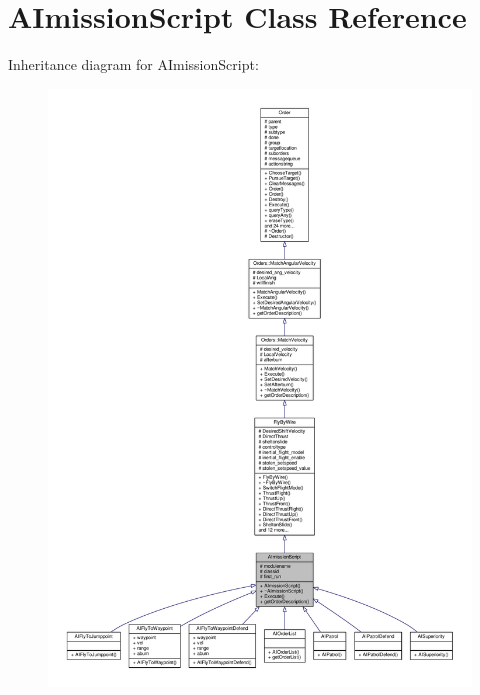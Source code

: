 \hypertarget{classAImissionScript}{}\section{A\+Imission\+Script Class Reference}
\label{classAImissionScript}


Inheritance diagram for A\+Imission\+Script\+:
\nopagebreak
\begin{figure}[H]
\begin{center}
\leavevmode
\includegraphics[width=350pt]{d0/dbc/classAImissionScript__inherit__graph}
\end{center}
\end{figure}


